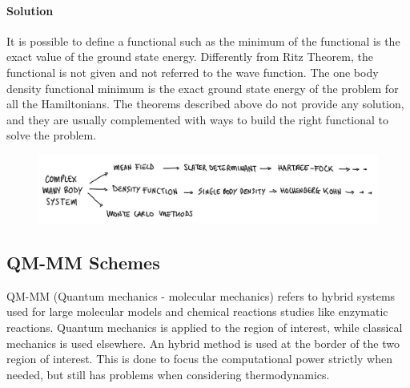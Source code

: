 			\paragraph{Solution}
			It is possible to define a functional such as the minimum of the functional is the exact value of the ground state energy.
			Differently from Ritz Theorem, the functional is not given and not referred to the wave function.
			The one body density functional minimum is the exact ground state energy of the problem for all the Hamiltonians.
			The theorems described above do not provide any solution, and they are usually complemented with ways to build the right functional to solve the problem.

\begin{figure}[htbp!]
	\centering
	\includegraphics[scale=0.30]{img_15}
\end{figure}

	\subsection{QM-MM Schemes}
	QM-MM (Quantum mechanics - molecular mechanics) refers to hybrid systems used for large molecular models and chemical reactions studies like enzymatic reactions.
	Quantum mechanics is applied to the region of interest, while classical mechanics is used elsewhere.
	An hybrid method is used at the border of the two region of interest.
	This is done to focus the computational power strictly when needed, but still has problems when considering thermodynamics.
